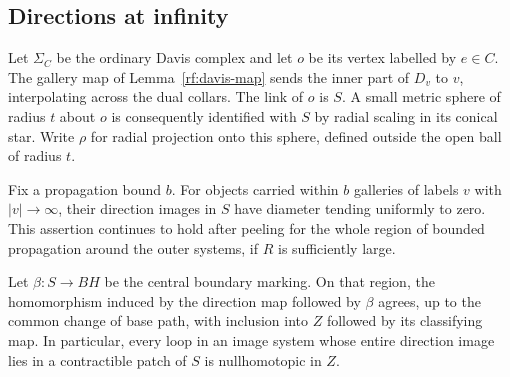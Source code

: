 \subsection{Directions at infinity}

Let $\Sigma_C$ be the ordinary Davis complex and let $o$ be its vertex
labelled by $e\in C$.  The gallery map of Lemma~\ref{rf:davis-map} sends
the inner part of $D_v$ to $v$, interpolating across the dual collars.
The link of $o$ is $S$.  A small metric sphere of radius $t$ about $o$
is consequently identified with $S$ by radial scaling in its conical
star.  Write $\rho$ for radial projection onto this sphere, defined
outside the open ball of radius $t$.

\begin{lemma}\label{ct:directions}
Fix a propagation bound $b$.  For objects carried within $b$ galleries
of labels $v$ with $|v|\to\infty$, their direction images in $S$ have
diameter tending uniformly to zero.  This assertion continues to hold
after peeling for the whole region of bounded propagation around the
outer systems, if $R$ is sufficiently large.

Let $\beta:S\to BH$ be the central boundary marking.  On that region,
the homomorphism induced by the direction map followed by $\beta$
agrees, up to the common change of base path, with inclusion into
$Z$ followed by its classifying map.  In particular, every loop in an
image system whose entire direction image lies in a contractible
patch of $S$ is nullhomotopic in $Z$.
\end{lemma}

